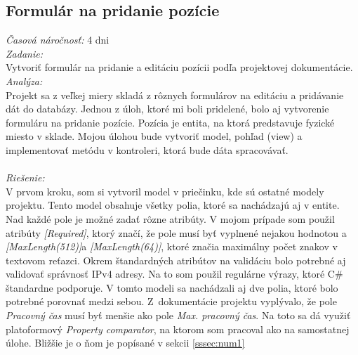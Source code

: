\documentclass[11pt, oneside]{report}
\begin{document}
\subsection{Formulár na pridanie pozície}
\textit{Časová náročnosť:} 4 dni\\
\textit{Zadanie:}\\
Vytvoriť formulár na pridanie a editáciu pozícii podľa projektovej dokumentácie.
\\\textit{Analýza:}\\
Projekt sa z veľkej miery skladá z rôznych formulárov na editáciu a pridávanie  dát do databázy. Jednou z úloh, ktoré mi boli pridelené, bolo aj vytvorenie formuláru na pridanie pozície. Pozícia je entita, na ktorá  predstavuje fyzické miesto  v sklade. Mojou úlohou bude  vytvoriť model, pohľad (view) a  implementovať  metódu v kontroleri, ktorá bude dáta  spracovávať. \\
\\\textit{Riešenie:}\\
V prvom kroku, som si vytvoril model v priečinku, kde sú ostatné modely projektu. Tento model obsahuje  všetky polia, ktoré sa nachádzajú aj v entite. Nad každé pole je možné zadať rôzne atribúty. V mojom prípade som použil atribúty \textit{[Required]}, ktorý značí, že pole  musí byť vyplnené nejakou hodnotou a \textit{[MaxLength(512)]}a \textit{[MaxLength(64)]}, ktoré značia maximálny počet znakov v textovom reťazci. Okrem štandardných atribútov na validáciu bolo potrebné aj validovať  správnosť IPv4 adresy. Na to som použil regulárne výrazy, ktoré C\# štandardne podporuje. V tomto modeli sa nachádzali aj dve polia, ktoré bolo potrebné porovnať medzi sebou. Z~dokumentácie projektu vyplývalo, že pole \textit{Pracovný čas} musí byť menšie ako pole \textit{Max. pracovný čas}. Na toto sa  dá využiť platoformový \textit{Property comparator}, na ktorom som pracoval ako na samostatnej úlohe. Bližšie je o ňom  je popísané v sekcii \ref{sssec:num1}
\end{document}
